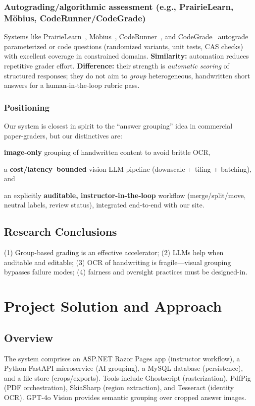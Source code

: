 \documentclass[ms,twoside,print]{nuthesis}
\newcommand{\Brand}[1]{\mbox{#1}} %
\begin{document}
\subsection{Autograding/algorithmic assessment (e.g., \Brand{PrairieLearn}, \Brand{M{\"o}bius}, \Brand{CodeRunner}/\Brand{CodeGrade})}
Systems like \Brand{PrairieLearn}~\cite{prairielearn}, \Brand{M{\"o}bius}~\cite{mobius}, \Brand{CodeRunner}~\cite{coderunner}, and
\Brand{CodeGrade}~\cite{codegrade} autograde parameterized or code questions (randomized variants, unit tests,
CAS checks) with excellent coverage in constrained domains. \textbf{Similarity:} automation reduces
repetitive grader effort. \textbf{Difference:} their strength is \emph{automatic scoring} of structured
responses; they do not aim to \emph{group} heterogeneous, handwritten short answers for a human-in-the-loop
rubric pass.

\subsection{Positioning}
Our system is closest in spirit to the \enquote{answer grouping} idea in commercial paper-graders, but
our distinctives are: 
\begin{compactenum}
  \item \textbf{image-only} grouping of handwritten content to avoid brittle OCR,
  \item a \textbf{cost/latency–bounded} vision-LLM pipeline (downscale + tiling + batching), and
  \item an explicitly \textbf{auditable, instructor-in-the-loop} workflow (merge/split/move, neutral labels, review status), integrated end-to-end with our site.
\end{compactenum}

\section{Research Conclusions}
(1) Group-based grading is an effective accelerator; (2) LLMs help when auditable and editable; (3) OCR of handwriting is fragile—visual grouping bypasses failure modes; (4) fairness and oversight practices must be designed-in.

\chapter{Project Solution and Approach}\label{chap:solution}

\section{Overview}
The system comprises an ASP.NET Razor Pages app (instructor workflow), a Python FastAPI microservice (AI grouping), a MySQL database (persistence), and a file store (crops/exports). Tools include Ghostscript (rasterization), PdfPig (PDF orchestration), SkiaSharp (region extraction), and Tesseract (identity OCR). GPT-4o Vision provides semantic grouping over cropped answer images.
\end{document}

